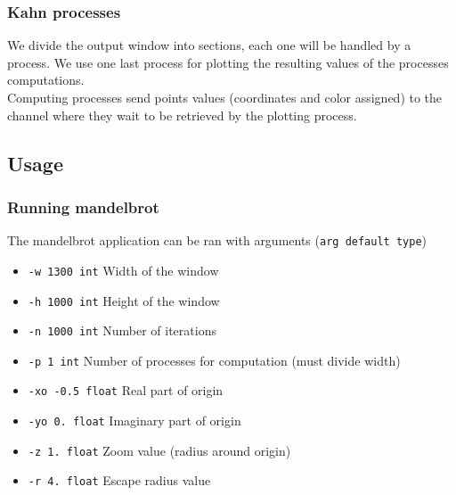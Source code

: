 \documentclass{article}
\begin{document}
\subsubsection{Kahn processes}
We divide the output window into sections, each one will be handled by a process. We use one last process for plotting the resulting values of the processes computations.\\
Computing processes send points values (coordinates and color assigned) to the channel where they wait to be retrieved by the plotting process.

\subsection{Usage}
\subsubsection{Running mandelbrot}
The mandelbrot application can be ran with arguments (\texttt{arg default type})
\begin{itemize}[label={}]
	\item \texttt{-w 1300 int} Width of the window
	\item \texttt{-h 1000 int} Height of the window
	\item \texttt{-n 1000 int} Number of iterations
	\item \texttt{-p 1 int} Number of processes for computation (must divide width)
	\item \texttt{-xo -0.5 float} Real part of origin
	\item \texttt{-yo 0. float} Imaginary part of origin
	\item \texttt{-z 1. float} Zoom value (radius around origin)
	\item \texttt{-r 4. float} Escape radius value 
	
\end{itemize}
\end{document}
